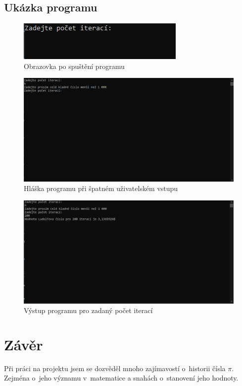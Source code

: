 \documentclass[11pt,a4paper]{report}
\begin{document}
	\section{Ukázka programu}
	\begin{figure}[h!]
			\centering
			\includegraphics[width=0.7\hsize]{img/spusteni.png}
			\caption{Obrazovka po spuštění programu}
		\end{figure}
		
	\begin{figure}[]
			\centering
			\includegraphics[width=1\hsize]{img/spusteni_chybny_vstup.png}
			\caption{Hláška programu při špatném uživatelském vstupu}
		\end{figure}
		
	\begin{figure}[]
			\centering
			\includegraphics[width=1\hsize]{img/spusteni_vysledek.png}
			\caption{Výstup programu pro zadaný počet iterací}
		\end{figure}
	
	\chapter*{Závěr}
	\pagestyle{empty}
	Při práci na projektu jsem se dozvěděl mnoho zajímavostí o~historii čísla $\pi$. Zejména o~jeho významu v~matematice a snahách o~stanovení jeho hodnoty. 
	
\end{document}
